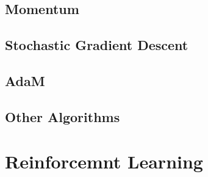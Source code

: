 \subsection{Momentum}
\subsection{Stochastic Gradient Descent}
\subsection{AdaM}
\subsection{Other Algorithms}

\section{Reinforcemnt Learning}

